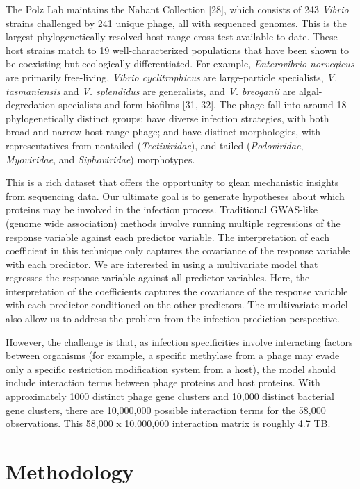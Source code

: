 \documentclass[12pt,twoside]{mitthesis-manusdown}
\begin{document}
The Polz Lab maintains the Nahant Collection {[}28{]}, which consists of
243 \emph{Vibrio} strains challenged by 241 unique phage, all with
sequenced genomes. This is the largest phylogenetically-resolved host
range cross test available to date. These host strains match to 19
well-characterized populations that have been shown to be coexisting but
ecologically differentiated. For example, \emph{Enterovibrio norvegicus}
are primarily free-living, \emph{Vibrio cyclitrophicus} are
large-particle specialists, \emph{V. tasmaniensis} and \emph{V.
splendidus} are generalists, and \emph{V. breoganii} are
algal-degredation specialists and form biofilms {[}31, 32{]}. The phage
fall into around 18 phylogenetically distinct groups; have diverse
infection strategies, with both broad and narrow host-range phage; and
have distinct morphologies, with representatives from nontailed
(\emph{Tectiviridae}), and tailed (\emph{Podoviridae},
\emph{Myoviridae}, and \emph{Siphoviridae}) morphotypes.

This is a rich dataset that offers the opportunity to glean mechanistic
insights from sequencing data. Our ultimate goal is to generate
hypotheses about which proteins may be involved in the infection
process. Traditional GWAS-like (genome wide association) methods involve
running multiple regressions of the response variable against each
predictor variable. The interpretation of each coefficient in this
technique only captures the covariance of the response variable with
each predictor. We are interested in using a multivariate model that
regresses the response variable against all predictor variables. Here,
the interpretation of the coefficients captures the covariance of the
response variable with each predictor conditioned on the other
predictors. The multivariate model also allow us to address the problem
from the infection prediction perspective.

However, the challenge is that, as infection specificities involve
interacting factors between organisms (for example, a specific methylase
from a phage may evade only a specific restriction modification system
from a host), the model should include interaction terms between phage
proteins and host proteins. With approximately 1000 distinct phage gene
clusters and 10,000 distinct bacterial gene clusters, there are
10,000,000 possible interaction terms for the 58,000 observations. This
58,000 x 10,000,000 interaction matrix is roughly 4.7 TB.

\section{Methodology}\label{methodology}
\end{document}
